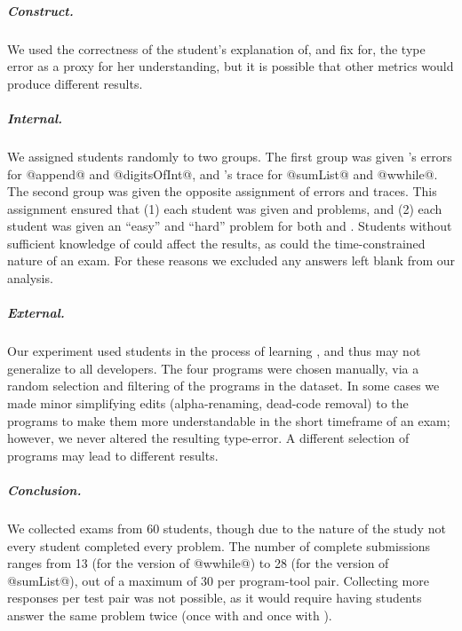 \subparagraph{Construct.}
%
We used the correctness of the student's explanation of, and fix for,
the type error as a proxy for her understanding, but it is possible
that other metrics would produce different results.

\subparagraph{Internal.}
%
We assigned students randomly to two groups. The first group was given
\ocaml's errors for @append@ and \hbox{@digitsOfInt@,} and \toolname's trace
for @sumList@ and @wwhile@. The second group was given the opposite
assignment of errors and traces. This assignment ensured that (1) each
student was given \ocaml and \toolname problems, and (2) each student
was given an ``easy'' and ``hard'' problem for both \ocaml and
\toolname. Students without sufficient knowledge of \ocaml could affect
the results, as could the time-constrained nature of an exam. For these
reasons we excluded any answers left blank from our analysis.

\subparagraph{External.}
%
Our experiment used students in the process of learning \ocaml,
and thus may not generalize to all developers. The four
programs were chosen manually, via a random selection and
filtering of the programs in the \ucsdbench dataset. In some cases we made
minor simplifying edits (\eg alpha-renaming, dead-code removal) to the
programs to make them more understandable in the short timeframe of an
exam; however, we never altered the resulting type-error. A different
selection of programs may lead to different results.

\subparagraph{Conclusion.}
%
We collected exams from 60 students, though due to the nature of the
study not every student completed every problem.
%
The number of complete submissions ranges from 13 (for the \toolname
version of @wwhile@) to 28 (for the \ocaml version of @sumList@), out of
a maximum of 30 per program-tool pair.
%
Collecting more responses per test pair was not possible, as it
would require having students answer the same problem twice (once with
\ocaml and once with \toolname).

